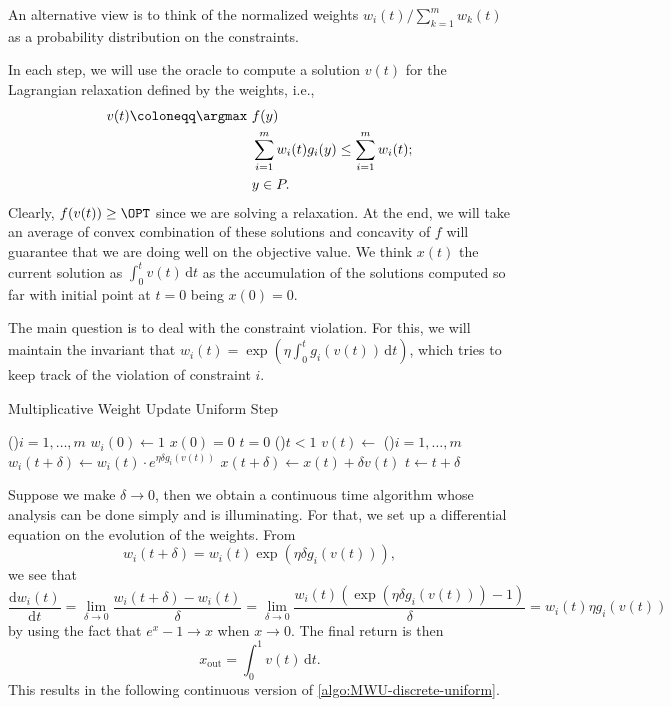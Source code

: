 \begin{intuition}
	An alternative view is to think of the normalized weights \(w_i(t) / \sum_{k=1}^{m} w_k(t)\) as a probability distribution on the constraints.
\end{intuition}

In each step, we will use the oracle to compute a solution \(v(t)\) for the Lagrangian relaxation defined by the weights, i.e.,
\[
	\begin{aligned}
		v(t) \coloneqq \argmax~ & f(y)                                                      \\
		                        & \sum_{i=1}^{m} w_i(t) g_i(y) \leq \sum_{i=1}^{m} w_i(t) ; \\
		                        & y\in P.
	\end{aligned}
\]
Clearly, \(f(v(t)) \geq \OPT\) since we are solving a relaxation. At the end, we will take an average of convex combination of these solutions and concavity of \(f\) will guarantee that we are doing well on the objective value. We think \(x(t)\) the current solution as \(\int_{0}^{t} v(t) \,\mathrm{d}t \) as the accumulation of the solutions computed so far with initial point at \(t=0\) being \(x(0) = 0\).

The main question is to deal with the constraint violation. For this, we will maintain the invariant that \(w_i(t) = \exp (\eta \int_{0}^{t} g_i(v(t)) \,\mathrm{d}t )\), which tries to keep track of the violation of constraint \(i\).

\begin{algorithm}[H]\label{algo:MWU-discrete-uniform}
	\DontPrintSemicolon{}
	\caption{Multiplicative Weight Update Uniform Step}
	\BlankLine

	\For(){\(i = 1, \dots , m\)}{
		\(w_i(0) \gets 1\)\;
	}
	\(x(0) = 0 \)\;
	\(t = 0\)\;
	\;
	\While(){\(t < 1\)}{
	\(v(t) \gets\)\;
	\For(){\(i = 1, \dots , m\)}{
		\(w_i(t+\delta ) \gets w_i(t) \cdot e^{\eta \delta g_i(v (t))}\)\;
	}
	\(x (t+\delta ) \gets x (t) + \delta v (t)\)\;
	\(t \gets t + \delta \)\;
	}
	\;
\end{algorithm}

Suppose we make \(\delta \to 0\), then we obtain a continuous time algorithm whose analysis can be done simply and is illuminating. For that, we set up a differential equation on the evolution of the weights. From
\[
	w_i(t+\delta )
	= w_i(t) \exp (\eta \delta g_i(v(t))),
\]
we see that
\[
	\frac{\mathrm{d}w_i(t)}{\mathrm{d}t}
	= \lim_{\delta \to 0} \frac{w_i(t+\delta ) - w_i(t)}{\delta }
	= \lim_{\delta \to 0} \frac{w_i(t) (\exp (\eta \delta g_i(v(t))) - 1)}{\delta }
	= w_i(t) \eta g_i(v(t))
\]
by using the fact that \(e^x -1 \to x\) when \(x \to 0\). The final return is then
\[
	x_{\text{out} }
	= \int_{0}^{1} v(t) \,\mathrm{d}t .
\]
This results in the following continuous version of \autoref{algo:MWU-discrete-uniform}.

